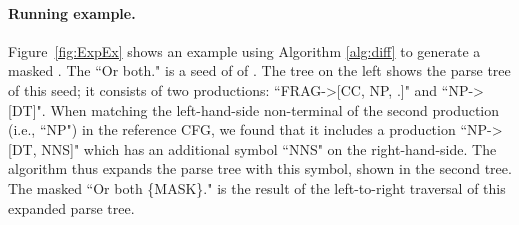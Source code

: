 \paragraph{Running example.} Figure~\ref{fig:ExpEx} shows an example using Algorithm \ref{alg:diff}
to generate a masked \sent. The \sent ``Or both." is a seed of \lc of
\SareqExOne.  The tree on the left shows the parse tree of this seed;
it consists of two productions: ``FRAG->[CC, NP, .]" and ``NP->[DT]".
When matching the left-hand-side non-terminal of the second production
(i.e., ``NP") in the reference CFG, we found that it includes a
production ``NP->[DT, NNS]" which has an additional symbol ``NNS" on
the right-hand-side.  The algorithm thus expands the parse tree with
this symbol, shown in the second tree.  The masked \sent ``Or both
\{MASK\}." is the result of the left-to-right traversal of this
expanded parse tree.


